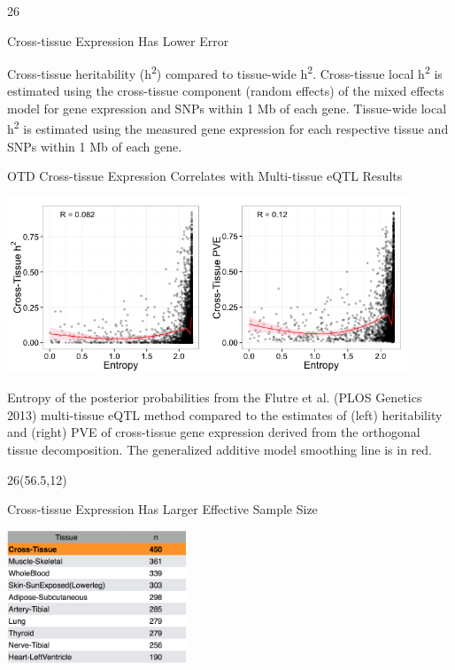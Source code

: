 \documentclass[final]{beamer}
\newcommand{\VcoordTop}{12}
\newcommand{\HcoordThird}{56.5}
\newcommand{\ColWidth}{26}
\begin{document}
\begin{frame}{}
\begin{textblock}{\ColWidth}
\begin{block}{Cross-tissue Expression Has Lower Error}
\begin{center}
	\end{center}
	{\tiny Cross-tissue heritability (h\textsuperscript{2}) compared to
tissue-wide h\textsuperscript{2}. Cross-tissue local
h\textsuperscript{2} is estimated using the cross-tissue component
(random effects) of the mixed effects model for gene expression and SNPs
within 1 Mb of each gene. Tissue-wide local h\textsuperscript{2} is
estimated using the measured gene expression for each respective tissue
and SNPs within 1 Mb of each gene.\\}

\end{block}

\begin{block}{OTD Cross-tissue Expression Correlates with Multi-tissue eQTL Results}
	\begin{center}
		\includegraphics[width=0.9\textwidth]{plots/Fig-CT-entropy.png}
	\end{center}
	{\tiny Entropy of the posterior probabilities from the Flutre et al. (PLOS Genetics 2013) multi-tissue eQTL method compared to the estimates of (left) heritability and (right) PVE of cross-tissue gene expression derived from the orthogonal tissue decomposition. The generalized additive model smoothing line is in red.\\}

\end{block}

\end{textblock}


\begin{textblock}{\ColWidth}(\HcoordThird,\VcoordTop)

\begin{block}{Cross-tissue Expression Has Larger Effective Sample Size}
	\begin{center}
		\includegraphics[width=0.4\textwidth]{plots/OTD-sample-increase.png}
	\end{center}


\end{block}
\end{textblock}
\end{frame}
\end{document}
